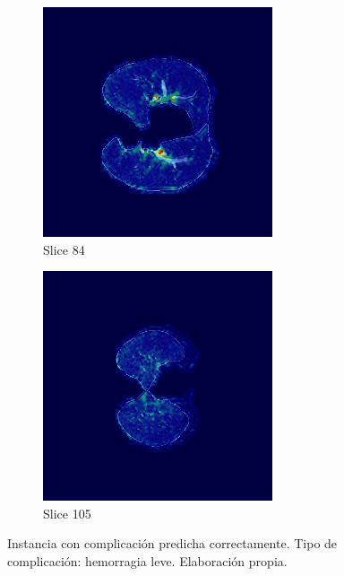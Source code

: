 \begin{figure}[!htbp]
\vspace{0.5cm}

\begin{subfigure}[b]{0.45\textwidth}
    \includegraphics[width=\textwidth]{img/label1_correcto_pred1_pid95HASH_slice_84.png}
    \caption{Slice 84}
\end{subfigure}
\hfill
\begin{subfigure}[b]{0.45\textwidth}
    \includegraphics[width=\textwidth]{img/label1_correcto_pred1_pid95HASH_slice_105.png}
    \caption{Slice 105}
\end{subfigure}

\caption{Instancia con complicación predicha correctamente. Tipo de complicación: hemorragia leve. Elaboración propia. }
\label{fig:label1-correcta}
\end{figure}


